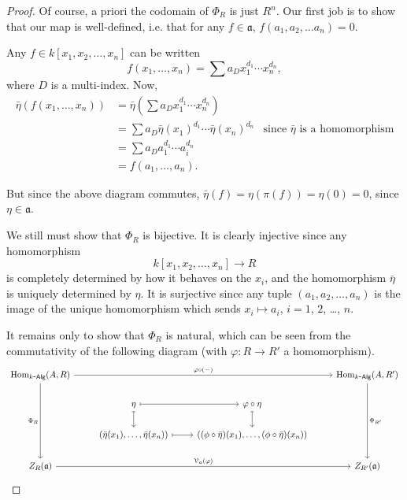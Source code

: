 \documentclass[a4paper,10pt]{scrreprt}
\newcommand{\Hom}{\mathrm{Hom}}
\def\mhyp{{\hbox{-}}}
\theoremstyle{definition}
\theoremstyle{plain}
\theoremstyle{remark}
\begin{document}
\begin{proof}
  Of course, a priori the codomain of $\Phi_{R}$ is just $R^{n}$. Our first job is to show that our map is well-defined, i.e. that for any $f \in \mathfrak{a}$, $f(a_{1}, a_{2}, \ldots a_{n}) = 0$.

  Any $f \in k[x_{1}, x_{2}, \ldots, x_{n}]$ can be written
  \begin{equation*}
    f(x_{1}, \ldots, x_{n}) = \sum a_{D} x_{1}^{d_{1}}\cdots x_{n}^{d_{n}},
  \end{equation*}
  where $D$ is a multi-index. Now,
  \begin{align*}
    \bar{\eta}(f(x_{1}, \ldots, x_{n})) &= \bar{\eta}\left( \sum a_{D} x_{1}^{d_{1}}\cdots x_{n}^{d_{n}} \right) \\
    &= \sum a_{D} \bar{\eta}(x_{1})^{d_{1}}\cdots \bar{\eta}(x_{n})^{d_{n}} &\text{since $\bar{\eta}$ is a homomorphism} \\
    &= \sum a_{D} a_{1}^{d_{1}}\cdots a_{i}^{d_{n}} \\
    &= f(a_{1}, \ldots, a_{n}).
  \end{align*}

  But since the above diagram commutes, $\bar{\eta}(f) = \eta(\pi(f)) = \eta(0) = 0$, since $\eta \in \mathfrak{a}$.

  We still must show that $\Phi_{R}$ is bijective. It is clearly injective since any homomorphism 
  \begin{equation*}
    k[x_{1}, x_{2}, \ldots, x_{n}] \to R
  \end{equation*}
  is completely determined by how it behaves on the $x_{i}$, and the homomorphism $\bar{\eta}$ is uniquely determined by $\eta$. It is surjective since any tuple $(a_{1}, a_{2}, \ldots, a_{n})$ is the image of the unique homomorphism which sends $x_{i} \mapsto a_{i}$, $i = 1$, $2$, \dots, $n$.

  It remains only to show that $\Phi_{R}$ is natural, which can be seen from the commutativity of the following diagram (with $\varphi\colon R \to R'$ a homomorphism).
  \begin{equation*}
    \begin{tikzcd}
      \Hom_{k\mhyp\mathsf{Alg}}(A, R)
      \arrow[rrr, "\varphi \circ (-)"]
      \arrow[ddd, swap, "\Phi_{R}"]
      & & & \Hom_{k\mhyp\mathsf{Alg}}(A, R')
      \arrow[ddd, "\Phi_{R'}"]
      \\
      & \eta
      \arrow[r, mapsto]
      \arrow[d, mapsto]
      & \varphi \circ \eta
      \arrow[d, mapsto]
      \\
      & (\bar{\eta}(x_1), \ldots, \bar{\eta}(x_{n}))
      \arrow[r, mapsto]
      & ((\phi \circ \bar{\eta})(x_1), \ldots, (\phi \circ \bar{\eta})(x_{n}))
      \\
      Z_{R}(\mathfrak{a})
      \arrow[rrr, "\mathcal{V}_{\mathfrak{a}}(\varphi)"]
      & & & Z_{R'}(\mathfrak{a})
    \end{tikzcd}
  \end{equation*}
\end{proof}
\end{document}

